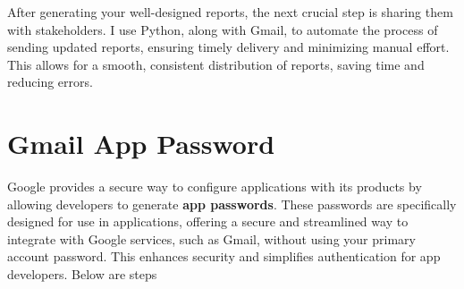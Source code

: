 \documentclass[
  letterpaper,
  DIV=11,
  numbers=noendperiod]{scrreprt}
\begin{document}
After generating your well-designed reports, the next crucial step is
sharing them with stakeholders. I use Python, along with Gmail, to
automate the process of sending updated reports, ensuring timely
delivery and minimizing manual effort. This allows for a smooth,
consistent distribution of reports, saving time and reducing errors.

\section{Gmail App Password}\label{gmail-app-password}

Google provides a secure way to configure applications with its products
by allowing developers to generate \textbf{app passwords}. These
passwords are specifically designed for use in applications, offering a
secure and streamlined way to integrate with Google services, such as
Gmail, without using your primary account password. This enhances
security and simplifies authentication for app developers. Below are
steps
\end{document}
